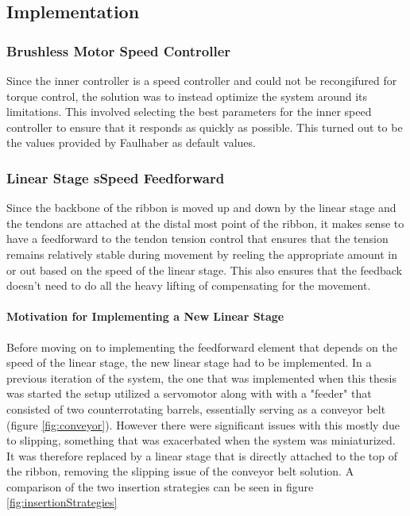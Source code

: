 \subsection{Implementation}

\subsubsection{Brushless Motor Speed Controller}
Since the inner controller is a speed controller and could not be recongifured for torque control, the solution was to instead optimize the system around its limitations. This involved selecting the best parameters for the inner speed controller to ensure that it responds as quickly as possible. This turned out to be the values provided by Faulhaber as default values. 

\subsubsection{Linear Stage sSpeed Feedforward}
Since the backbone of the ribbon is moved up and down by the linear stage and the tendons are attached at the distal most point of the ribbon, it makes sense to have a feedforward to the tendon tension control that ensures that the tension remains relatively stable during movement by reeling the appropriate amount in or out based on the speed of the linear stage. This also ensures that the feedback doesn't need to do all the heavy lifting of compensating for the movement.

\paragraph*{Motivation for Implementing a New Linear Stage}
Before moving on to implementing the feedforward element that depends on the speed of the linear stage, the new linear stage had to be implemented. In a previous iteration of the system, the one that was implemented when this thesis was started the setup utilized a servomotor along with with a "feeder" that consisted of two counterrotating barrels, essentially serving as a conveyor belt (figure \ref{fig:conveyor}). However there were significant issues with this mostly due to slipping, something that was exacerbated when the system was miniaturized. It was therefore replaced by a linear stage that is directly attached to the top of the ribbon, removing the slipping issue of the conveyor belt solution. A comparison of the two insertion strategies can be seen in figure \ref{fig:insertionStrategies}

